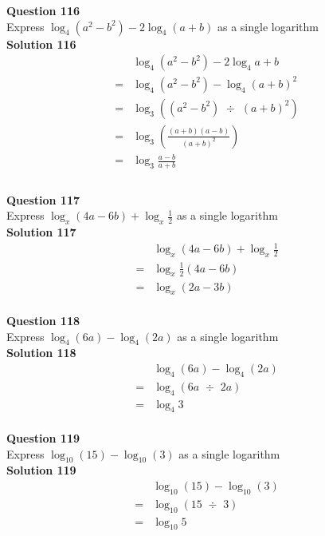 \documentclass{article}
\begin{document}
\noindent\textbf{Question 116}\\[5pt]
Express $\log_{4}(a^2-b^2)-2\log_{4}(a+b)$ as a single logarithm\\[5pt]
\noindent\textbf{Solution 116}\\[5pt]
\begin{align*}
&\log_{4}(a^2-b^2)-2\log_{4}a+b\\[2pt]
=&\log_{4}(a^2-b^2)-\log_{4}(a+b)^2\\[2pt]
=&\log_{3}((a^2-b^2) \,\, \div \,\, (a+b)^2)\\[2pt]
=&\log_{3}\left(\displaystyle\frac{(a+b)(a-b)}{(a+b)^2}\right)\\[2pt]
=&\log_{3}\displaystyle\frac{a-b}{a+b}\\[-130pt]
\end{align*}\\[10pt]

\noindent\textbf{Question 117}\\[5pt]
Express $\log_{x}(4a-6b)+\log_{x}\displaystyle\frac{1}{2}$ as a single logarithm\\[5pt]
\noindent\textbf{Solution 117}\\[5pt]
\begin{align*}
&\log_{x}(4a-6b)+\log_{x}\displaystyle\frac{1}{2}\\[2pt]
=&\log_{x}\displaystyle\frac{1}{2}(4a-6b)\\[2pt]
=&\log_{x}(2a-3b)
\end{align*}\\[10pt]

\noindent\textbf{Question 118}\\[5pt]
Express $\log_{4}(6a)-\log_{4}(2a)$ as a single logarithm\\[5pt]
\noindent\textbf{Solution 118}\\[5pt]
\begin{align*}
&\log_{4}(6a)-\log_{4}(2a)\\[2pt]
=&\log_{4}(6a \,\, \div \,\, 2a)\\[2pt]
=&\log_{4}3
\end{align*}\\[10pt]

\noindent\textbf{Question 119}\\[5pt]
Express $\log_{10}(15)-\log_{10}(3)$ as a single logarithm\\[5pt]
\noindent\textbf{Solution 119}\\[5pt]
\begin{align*}
&\log_{10}(15)-\log_{10}(3)\\[2pt]
=&\log_{10}(15 \,\, \div \,\, 3)\\[2pt]
=&\log_{10}5
\end{align*}\\[10pt]
\end{document}
